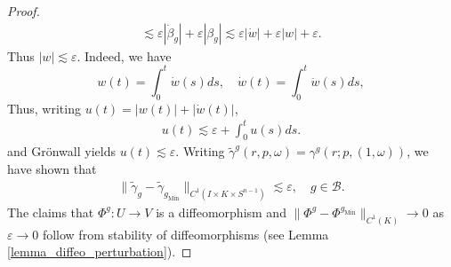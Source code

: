 \documentclass[11pt,letterpaper]{amsart}
\theoremstyle{definition}
\numberwithin{equation}{section}
\newcommand{\norm}[1]{\lVert #1 \rVert}         %
\newcommand{\eps}{\varepsilon}
\newcommand{\gm}{g_{\mathrm{Min}}}
\begin{document}
\begin{proof}
\begin{align*}
\lesssim \eps |\dot \beta_g| + \eps |\beta_g|
\lesssim \eps |\dot w| + \eps |w| + \eps.
    \end{align*}
Thus $|w| \lesssim \eps$. Indeed,  
we have
\begin{equation*}
w(t) = \int_0^t \dot w(s) ds, 
\quad 
\dot w(t) = \int_0^t \ddot w(s) ds,
\end{equation*}
Thus, writing $u(t)=|w(t)|+|\dot w(t)|$,
    \begin{align*}
u(t) \lesssim \eps + \int_0^t u(s) ds.
    \end{align*}
and Gr\"onwall yields $u(t)\lesssim \eps$.
Writing $\tilde \gamma^g(r, p, \omega) = \gamma^g(r; p, (1, \omega))$, we have shown that 
    \begin{align*}
\norm{\tilde \gamma_g - \tilde \gamma_{\gm}}_{C^1(I \times K \times S^{n-1})}
\lesssim \eps, \quad g \in \mathcal B.
    \end{align*}
The claims that $\Phi^g : U \to V$ 
is a diffeomorphism and $\norm{\Phi^g - \Phi^{\gm}}_{C^1(K)} \to 0$ as $\eps \to 0$ follow from stability of diffeomorphisms (see Lemma \ref{lemma_diffeo_perturbation}).
\end{proof}
\end{document}
